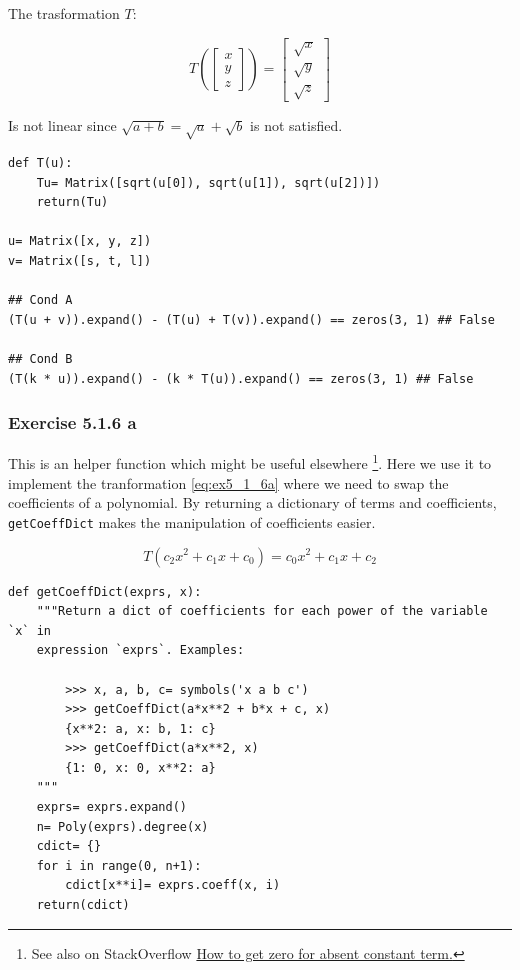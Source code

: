 The trasformation $T$:

$$
T(\left[\begin{matrix}x\\y\\z\end{matrix}\right]) = \left[\begin{matrix}\sqrt{x}\\\sqrt{y}\\\sqrt{z}\end{matrix}\right]
$$

Is not linear since $\sqrt{a + b} = \sqrt{a} + \sqrt{b}$ is not satisfied.

\begin{verbatim}
def T(u):
    Tu= Matrix([sqrt(u[0]), sqrt(u[1]), sqrt(u[2])])
    return(Tu)
    
u= Matrix([x, y, z])
v= Matrix([s, t, l])

## Cond A
(T(u + v)).expand() - (T(u) + T(v)).expand() == zeros(3, 1) ## False

## Cond B
(T(k * u)).expand() - (k * T(u)).expand() == zeros(3, 1) ## False
\end{verbatim}

\subsubsection{Exercise 5.1.6 a}

This is an helper function which might be useful elsewhere \footnote{See also
on StackOverflow \href{http://stackoverflow.com/questions/29434911/sympy-how-to-get-zero-for-absent-constant-term/}
{How to get zero for absent constant term.}}. Here we use it to implement the
tranformation \ref{eq:ex5_1_6a} where we need to swap the coefficients of a
polynomial. By returning a dictionary of terms and coefficients, \texttt{getCoeffDict}
makes the manipulation of coefficients easier.

\begin{equation}\label{eq:ex5_1_6a}
T(c_2 x^2 + c_1 x + c_0) = c_0 x^2 + c_1 x + c_2
\end{equation}

\begin{verbatim}
def getCoeffDict(exprs, x):
    """Return a dict of coefficients for each power of the variable `x` in
    expression `exprs`. Examples:
    
        >>> x, a, b, c= symbols('x a b c')
        >>> getCoeffDict(a*x**2 + b*x + c, x)
        {x**2: a, x: b, 1: c}
        >>> getCoeffDict(a*x**2, x)
        {1: 0, x: 0, x**2: a}
    """
    exprs= exprs.expand()
    n= Poly(exprs).degree(x)
    cdict= {}
    for i in range(0, n+1):
        cdict[x**i]= exprs.coeff(x, i)
    return(cdict)
\end{verbatim}

